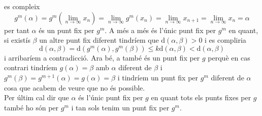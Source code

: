 \documentclass[a4paper,10pt]{article}
\renewcommand{\*}{\cdot}
\renewcommand{\d}{\text{d}}
\renewcommand{\a}{\alpha}
\renewcommand{\b}{\beta}
\begin{document}
es compleix
\begin{equation*}
g^m(\a)=g^m(\lim\limits_{n\to\infty}x_n)=\lim\limits_{n\to\infty} g^m(x_n)=\lim\limits_{n\to\infty} x_{n+1}=\lim\limits_{n\to\infty} x_n=\a
\end{equation*}
per tant $\a$ és un punt fix per $g^m$. A més a més és l'únic punt fix per $g^m$ en quant, si existís $\beta$ un altre punt fix diferent tindríem que $\d(\a,\beta)>0$ i es compliria
\begin{equation*}
\d(\a,\b)=\d(g^m(\a),g^m(\b))\le k\d(\a,\b)<\d(\a,\b)
\end{equation*}
i arribaríem a contradicció. Ara bé, a també és un punt fix per $g$ perquè en cas contrari tindríem $g(\a)=\b$ amb $\a$ diferent de $\b$ i $g^m(\b)=g^{m+1}(\a)=g(\a)=\b$
i tindríem un punt fix per $g^m$ diferent de $\a$ cosa que acabem de veure que no és possible.\\
Per últim cal dir que $\a$ és l'únic punt fix per $g$ en quant tots els punts fixes per $g$ també ho són per $g^m$ i tan sols tenim un punt fix per $g^m$.
\end{document}
